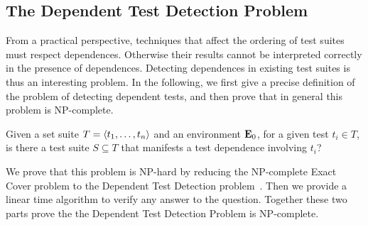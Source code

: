 




\subsection{The Dependent Test Detection Problem}

From a practical perspective, techniques that affect the ordering of
test suites must respect dependences. Otherwise their results cannot
be interpreted correctly in the presence of dependences. Detecting
dependences in existing test suites is thus an interesting problem.
In the following, we first give a precise definition of the problem of
detecting dependent tests, and then prove that in general this problem
is NP-complete. 


\begin{definition}
Given a set suite\/ $T =  \langle t_1, \dots, t_n \rangle $ and an environment\/
$\mathbf{E}_0$, for a given test\/ $t_i \in T$, is there a test suite\/ $S
\subseteq T$ that manifests a test dependence involving\/ $t_i$? 
\end{definition}

We prove that this problem is NP-hard by reducing the NP-complete Exact Cover problem
to the Dependent Test Detection
problem~\cite{karp:NP:1972}. 
Then we provide a linear time algorithm to verify any answer to the
question.
Together these two parts prove the the Dependent Test Detection Problem is NP-complete.

